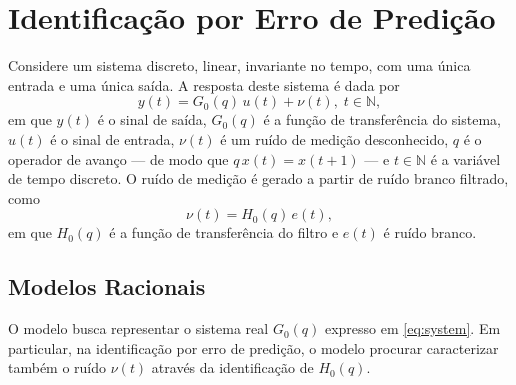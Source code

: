 \documentclass{ppgeesa}
\newcommand{\Prod}{\,}
\begin{document}
\section{Identificação por Erro de Predição}

Considere um sistema discreto, linear, invariante no tempo, com uma única entrada e uma única saída.
A resposta deste sistema é dada por
\begin{equation}\label{eq:system}
  y(t) = G_0(q) \Prod u(t) + \nu(t)
  ,\; t \in \mathbb{N}
  ,
\end{equation}
em que
$y(t)$ é o sinal de saída,
$G_0(q)$ é a função de transferência do sistema,
$u(t)$ é o sinal de entrada,
$\nu(t)$ é um ruído de medição desconhecido, %
$q$ é o operador de avanço --- de modo que $q \Prod x(t) = x(t+1)$ --- e
$t \in \mathbb{N}$ é a variável de tempo discreto.
O ruído de medição é gerado a partir de ruído branco filtrado, como
\begin{equation}
  \nu(t) = H_0(q) \Prod e(t)
  ,
\end{equation}
em que
$H_0(q)$ é a função de transferência do filtro e
$e(t)$ é ruído branco.

\subsection{Modelos Racionais}

O modelo busca representar o sistema real $G_0(q)$ expresso em \eqref{eq:system}.
Em particular, na identificação por erro de predição, o modelo procurar caracterizar também o ruído $\nu(t)$ através da identificação de $H_0(q)$.
\end{document}
